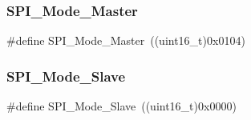 \subsubsection{\texorpdfstring{SPI\_Mode\_Master}{SPI\_Mode\_Master}}
{\footnotesize\ttfamily \#define S\+P\+I\+\_\+\+Mode\+\_\+\+Master~((uint16\+\_\+t)0x0104)}

\mbox{\label{group___s_p_i__mode_ga84621141413ee07cb2d2dc82da2baa42}} 
\subsubsection{\texorpdfstring{SPI\_Mode\_Slave}{SPI\_Mode\_Slave}}
{\footnotesize\ttfamily \#define S\+P\+I\+\_\+\+Mode\+\_\+\+Slave~((uint16\+\_\+t)0x0000)}

